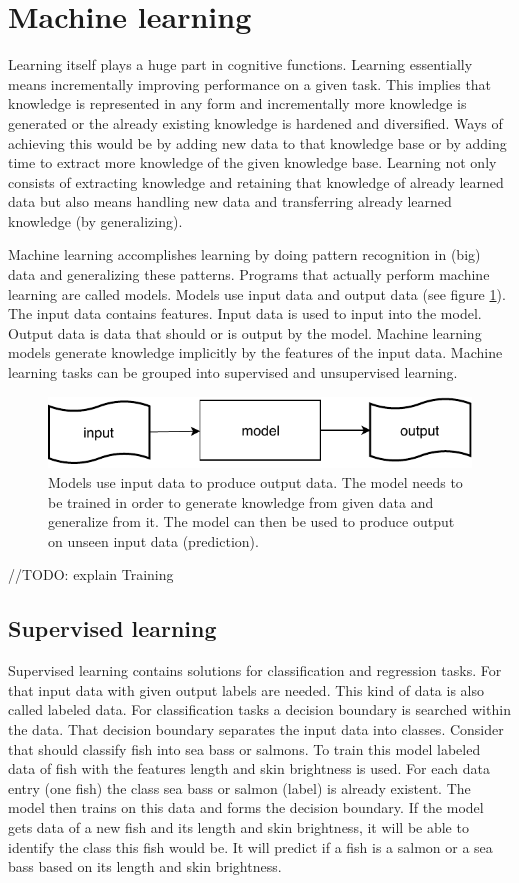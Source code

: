 \documentclass[jou,apacite]{apa6}
\begin{document}
\section{Machine learning}
Learning itself plays a huge part in cognitive functions. Learning essentially means incrementally improving performance on a given task. This implies that knowledge is represented in any form and incrementally more knowledge is generated or the already existing knowledge is hardened and diversified. Ways of achieving this would be by adding new data to that knowledge base or by adding time to extract more knowledge of the given knowledge base. Learning not only consists of extracting knowledge and retaining that knowledge of already learned data but also means handling new data and transferring already learned knowledge (by generalizing).

Machine learning accomplishes learning by doing pattern recognition in (big) data and generalizing these patterns. 
Programs that actually perform machine learning are called models. Models use input data and output data (see figure \ref{fig:machine-learning-basic}). The input data contains features. Input data is used to input into the model. Output data is data that should or is output by the model. Machine learning models generate knowledge implicitly by the features of the input data. Machine learning tasks can be grouped into supervised and unsupervised learning.

\begin{figure}[!htb]
\centering
	\includegraphics[width=.4\textwidth]{machine-learning-basic.pdf}
\caption[Basic structure of machine learning]{Models use input data to produce output data. The model needs to be trained in order to generate knowledge from given data and generalize from it. The model can then be used to produce output on unseen input data (prediction).}
\label{fig:machine-learning-basic}
\end{figure}

//TODO: explain Training

\subsection{Supervised learning}
Supervised learning contains solutions for classification and regression tasks. For that input data with given output labels are needed. This kind of data is also called labeled data. For classification tasks a decision boundary is searched within the data. That decision boundary separates the input data into classes. Consider that should classify fish into sea bass or salmons. To train this model labeled data of fish with the features length and skin brightness is used. For each data entry (one fish) the class sea bass or salmon (label) is already existent. The model then trains on this data and forms the decision boundary. If the model gets data of a new fish and its length and skin brightness, it will be able to identify the class this fish would be. It will predict if a fish is a salmon or a sea bass based on its length and skin brightness.
\end{document}

